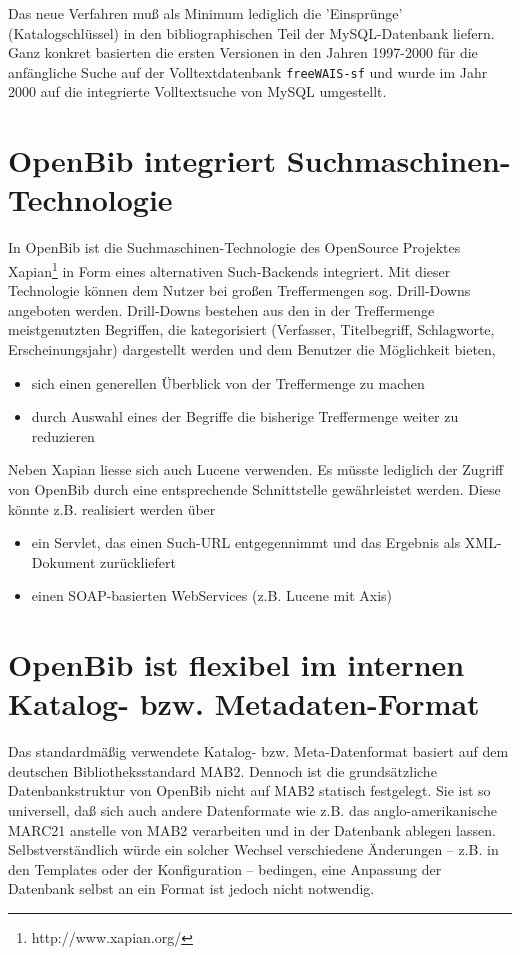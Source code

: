 \documentclass[11pt, twoside, a4paper, BCOR8mm, DIV12, bibtotoc,idxtotoc]{scrbook}
\begin{document}
Das neue Verfahren muß als Minimum lediglich die 'Einsprünge'
(Katalogschlüssel) in den biblio\-gra\-phi\-schen Teil der MySQL-Datenbank
liefern. Ganz konkret basierten die ersten Versionen in den Jahren
1997-2000 für die anfängliche Suche auf der Volltextdatenbank
\texttt{freeWAIS-sf} und wurde im Jahr 2000 auf die integrierte
Volltextsuche von MySQL umgestellt.


\section{OpenBib integriert Suchmaschinen-Technologie}
In OpenBib ist die Suchmaschinen-Technologie des OpenSource Projektes
Xapian\footnote{http://www.xapian.org/} in Form eines alternativen
Such-Backends integriert. Mit dieser Technologie können dem Nutzer bei
großen Treffermengen sog. Drill-Downs angeboten werden. Drill-Downs
bestehen aus den in der Treffermenge meistgenutzten Begriffen, die
kategorisiert (Verfasser, Titelbegriff, Schlagworte, Erscheinungsjahr)
dargestellt werden und dem Benutzer die Möglichkeit bieten,
\begin{itemize}
\item sich einen generellen Überblick von der Treffermenge zu machen
\item durch Auswahl eines der Begriffe die bisherige Treffermenge
  weiter zu reduzieren 
\end{itemize}

Neben Xapian liesse sich auch Lucene verwenden. Es müsste lediglich
der Zugriff von OpenBib durch eine entsprechende Schnittstelle
gewährleistet werden. Diese könnte z.B. realisiert werden über


\begin{itemize}
\item ein Servlet, das einen Such-URL entgegennimmt und das Ergebnis
  als XML-Dokument zurückliefert
\item einen SOAP-basierten WebServices (z.B. Lucene mit Axis)
\end{itemize}

\section{OpenBib ist flexibel im internen Katalog- bzw. Metadaten-Format}
Das standardmäßig verwendete Katalog- bzw. Meta-Datenformat basiert
auf dem deutschen Bibliotheksstandard MAB2. Dennoch ist die
grundsätzliche Datenbankstruktur von OpenBib nicht auf MAB2 statisch
festgelegt. Sie ist so universell, daß sich auch andere Datenformate
wie z.B. das anglo-amerikanische MARC21 anstelle von MAB2 verarbeiten
und in der Datenbank ablegen lassen. Selbstverständlich würde ein
solcher Wechsel verschiedene Änderungen -- z.B. in den Templates oder
der Konfiguration -- bedingen, eine Anpassung der Datenbank selbst an
ein Format ist jedoch nicht notwendig.
\end{document}
